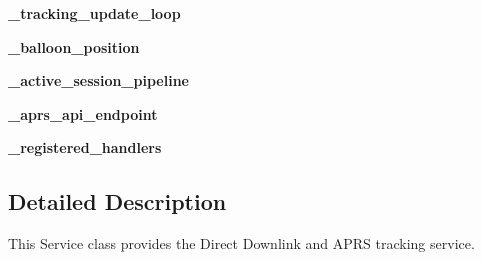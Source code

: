\begin{DoxyCompactItemize}
\item 
\hypertarget{classhwm_1_1hardware_1_1devices_1_1drivers_1_1mxl__balloon__tracker_1_1mxl__balloon__tracker_1_1e3a9bc8b0b4bc235d39c93a5b84975bc_ac91b94abf4ac5a27de5283bf5ab069ae}{{\bfseries \-\_\-tracking\-\_\-update\-\_\-loop}}\label{classhwm_1_1hardware_1_1devices_1_1drivers_1_1mxl__balloon__tracker_1_1mxl__balloon__tracker_1_1e3a9bc8b0b4bc235d39c93a5b84975bc_ac91b94abf4ac5a27de5283bf5ab069ae}

\item 
\hypertarget{classhwm_1_1hardware_1_1devices_1_1drivers_1_1mxl__balloon__tracker_1_1mxl__balloon__tracker_1_1e3a9bc8b0b4bc235d39c93a5b84975bc_a83d967573ca409b7ba731370a3b400c7}{{\bfseries \-\_\-balloon\-\_\-position}}\label{classhwm_1_1hardware_1_1devices_1_1drivers_1_1mxl__balloon__tracker_1_1mxl__balloon__tracker_1_1e3a9bc8b0b4bc235d39c93a5b84975bc_a83d967573ca409b7ba731370a3b400c7}

\item 
\hypertarget{classhwm_1_1hardware_1_1devices_1_1drivers_1_1mxl__balloon__tracker_1_1mxl__balloon__tracker_1_1e3a9bc8b0b4bc235d39c93a5b84975bc_a72a721cba4e30e91f36a8db4381af6d3}{{\bfseries \-\_\-active\-\_\-session\-\_\-pipeline}}\label{classhwm_1_1hardware_1_1devices_1_1drivers_1_1mxl__balloon__tracker_1_1mxl__balloon__tracker_1_1e3a9bc8b0b4bc235d39c93a5b84975bc_a72a721cba4e30e91f36a8db4381af6d3}

\item 
\hypertarget{classhwm_1_1hardware_1_1devices_1_1drivers_1_1mxl__balloon__tracker_1_1mxl__balloon__tracker_1_1e3a9bc8b0b4bc235d39c93a5b84975bc_a3e27278b796ff1af12ebdb39ab738e3a}{{\bfseries \-\_\-aprs\-\_\-api\-\_\-endpoint}}\label{classhwm_1_1hardware_1_1devices_1_1drivers_1_1mxl__balloon__tracker_1_1mxl__balloon__tracker_1_1e3a9bc8b0b4bc235d39c93a5b84975bc_a3e27278b796ff1af12ebdb39ab738e3a}

\item 
\hypertarget{classhwm_1_1hardware_1_1devices_1_1drivers_1_1mxl__balloon__tracker_1_1mxl__balloon__tracker_1_1e3a9bc8b0b4bc235d39c93a5b84975bc_ac29ca622767751345650b27a3fc34814}{{\bfseries \-\_\-registered\-\_\-handlers}}\label{classhwm_1_1hardware_1_1devices_1_1drivers_1_1mxl__balloon__tracker_1_1mxl__balloon__tracker_1_1e3a9bc8b0b4bc235d39c93a5b84975bc_ac29ca622767751345650b27a3fc34814}

\end{DoxyCompactItemize}


\subsection{Detailed Description}
This Service class provides the Direct Downlink and A\-P\-R\-S tracking service. 


